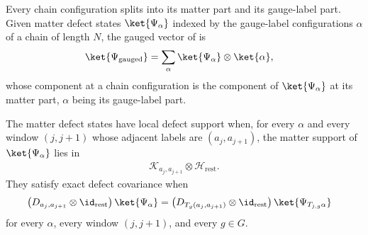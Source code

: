 \begin{definition}
    \label{def:mpug_gauged_vector}
    \leanok
    Every chain configuration splits into its matter part and its gauge-label
    part. Given matter defect states $\ket{\Psi_\alpha}$ indexed by the
    gauge-label configurations $\alpha$ of a chain of length $N$, the gauged
    vector of \cite[lines~4325--4335]{FrancoRubio2025MPUGauging} is
    \begin{align}
        \ket{\Psi_{\mathrm{gauged}}}
         & =\sum_\alpha\ket{\Psi_\alpha}\otimes\ket{\alpha},
        \label{eq:mpug_gauged_vector}
    \end{align}
    whose component at a chain configuration is the component of
    $\ket{\Psi_\alpha}$ at its matter part, $\alpha$ being its gauge-label
    part.
\end{definition}

\begin{definition}
    \label{def:mpug_defect_state_hypotheses}
    \leanok
    The matter defect states have local defect support when, for every
    $\alpha$ and every window $(j,j+1)$ whose adjacent labels are
    $(a_j,a_{j+1})$, the matter support of $\ket{\Psi_\alpha}$ lies in
    \begin{align}
        \mathcal K_{a_j,a_{j+1}}\otimes\mathcal H_{\mathrm{rest}}.
    \end{align}
    They satisfy exact defect covariance when
    \begin{align}
        \left(D_{a_j,a_{j+1}}\otimes\id_{\mathrm{rest}}\right)
        \ket{\Psi_\alpha}
         & =\left(D_{T_g(a_j,a_{j+1})}\otimes\id_{\mathrm{rest}}\right)
        \ket{\Psi_{T_{j,g}\alpha}}
        \label{eq:mpug_exact_defect_covariance}
    \end{align}
    for every $\alpha$, every window $(j,j+1)$, and every $g\in G$.
\end{definition}

